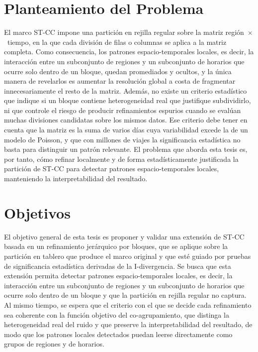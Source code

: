 \section{Planteamiento del Problema}
\label{sec:problema}

El marco \ac{ST-CC} impone una partición en rejilla regular sobre la matriz
región~$\times$~tiempo, en la que cada división de filas o columnas se
aplica a la matriz completa. Como consecuencia, los patrones
espacio-temporales locales, es decir, la interacción entre un
subconjunto de regiones y un subconjunto de horarios que ocurre solo dentro
de un bloque, quedan promediados y ocultos, y la única manera de revelarlos
es aumentar la resolución global a costa de fragmentar innecesariamente el
resto de la matriz. Además, no existe un criterio estadístico que indique
si un bloque contiene heterogeneidad real que justifique subdividirlo, ni
que controle el riesgo de producir refinamientos espurios cuando se evalúan
muchas divisiones candidatas sobre los mismos datos. Ese criterio debe tener
en cuenta que la matriz es la suma de varios días cuya variabilidad excede la
de un modelo de Poisson, y que con millones de viajes la significancia
estadística no basta para distinguir un patrón relevante. El problema que aborda
esta tesis es, por tanto, cómo refinar localmente y de forma
estadísticamente justificada la partición de \ac{ST-CC} para detectar
patrones espacio-temporales locales, manteniendo la interpretabilidad del
resultado.

\section{Objetivos}
\label{sec:objetivos}

El objetivo general de esta tesis es proponer y validar una extensión de
\ac{ST-CC} basada en un refinamiento jerárquico por bloques, que se aplique
sobre la partición en tablero que produce el marco original y que esté guiado
por pruebas de significancia estadística derivadas de la I-divergencia. Se
busca que esta extensión permita detectar patrones espacio-temporales locales,
es decir, la interacción entre un subconjunto de regiones y un subconjunto de
horarios que ocurre solo dentro de un bloque y que la partición en rejilla
regular no captura. Al mismo tiempo, se espera que el criterio con el que se
decide cada refinamiento sea coherente con la función objetivo del
co-agrupamiento, que distinga la heterogeneidad real del ruido y que preserve
la interpretabilidad del resultado, de modo que los patrones locales
detectados puedan leerse directamente como grupos de regiones y de horarios.

